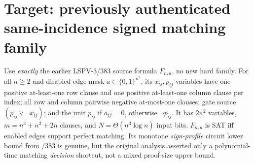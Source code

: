 \documentclass[11pt]{article}
\begin{document}
\section*{Target: previously authenticated same-incidence signed matching family}
Use \emph{exactly} the earlier LSPV-3/383 source formula $F_{n,a}$, no new hard family. For all $n\ge2$ and disabled-edge mask $a\in\{0,1\}^{n^2}$, its $x_{ij},p_{ij}$ variables have one positive at-least-one row clause and one positive at-least-one column clause per index; all row and column pairwise negative at-most-one clauses; gate source $(p_{ij}\lor\neg x_{ij})$; and the unit $p_{ij}$ if $a_{ij}=0$, otherwise $\neg p_{ij}$. It has $2n^2$ variables, $m=n^3+n^2+2n$ clauses, and $N=\Theta(n^3\log n)$ input bits. $F_{n,a}$ is SAT iff enabled edges support perfect matching. Its monotone \emph{sign-profile} circuit lower bound from /383 is genuine, but the original analysis asserted only a polynomial-time matching \emph{decision} shortcut, not a mixed proof-size upper bound.
\end{document}
